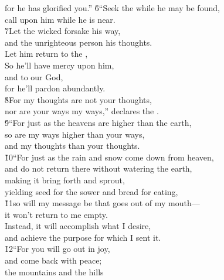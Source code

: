 \begin{poetry}
\poemll    for he has glorified you.''
\poeml \v{6}``Seek the  while he may be found, \\
\poemll    call upon him while he is near. \\
\poeml \v{7}Let the wicked forsake his way, \\
\poemll    and the unrighteous person his thoughts. \\
\poeml Let him return to the , \\
\poemll    So he'll have mercy upon him, \\
\poeml and to our God, \\
\poemll    for he'll pardon abundantly. \\
\poeml \v{8}For my thoughts are not your thoughts, \\
\poemll    nor are your ways my ways,'' declares the . \\
\poeml \v{9}``For just as the heavens are higher than the earth, \\
\poemll    so are my ways higher than your ways, \\
\poemlll       and my thoughts than your thoughts. \\
\poeml \v{10}``For just as the rain and snow come down from heaven, \\
\poemll    and do not return there without watering the earth, \\
\poeml making it bring forth and sprout, \\
\poemll    yielding seed for the sower and bread for eating, \\
\poeml \v{11}so will my message be that goes out of my mouth--- \\
\poemll    it won't return to me empty. \\
\poeml Instead, it will accomplish what I desire, \\
\poemll    and achieve the purpose for which I sent it. \\
\poeml \v{12}``For you will go out in joy, \\
\poemll    and come back with peace; \\
\poeml the mountains and the hills \\

\end{poetry}
